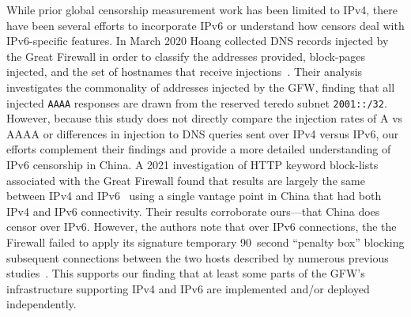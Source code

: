 While prior global censorship measurement work has been limited to IPv4, 
there have been several efforts to incorporate IPv6 or understand how censors
deal with IPv6-specific features.
In March 2020 Hoang \etal collected DNS records injected by the Great
Firewall in order to classify the addresses provided, block-pages injected, and
the set of hostnames that receive injections~\cite{USESEC21:GFWatch}. Their
analysis investigates the commonality of addresses injected by the GFW, finding
that all injected \texttt{AAAA} responses are drawn from the reserved teredo
subnet \texttt{2001::/32}. However, because this study does not directly
compare the injection rates of A vs AAAA or differences in injection to DNS
queries sent over IPv4 versus IPv6, our efforts complement their findings and
provide a more detailed understanding of IPv6 censorship in China.
%
A 2021 investigation of HTTP keyword block-lists associated with the Great
Firewall found that results are largely the same between IPv4 and
IPv6~\cite{weinberg2021chinese} using a single vantage point in China that had
both IPv4 and IPv6 connectivity. Their results corroborate ours---that China does
censor over IPv6. However, the authors note that over IPv6
connections, the the Firewall failed to apply its signature temporary 90~second
``penalty box'' blocking subsequent connections between the two hosts described
by numerous previous studies~\cite{xu2011internet,clayton2006ignoring}. This
supports our finding that at least some parts of the GFW's infrastructure supporting IPv4 and
IPv6 are implemented and/or deployed independently.


